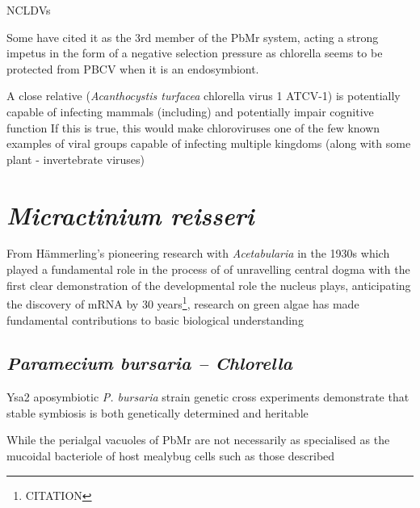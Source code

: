 NCLDVs 

Some have cited it as the 3rd member of the PbMr system, acting a strong impetus in the form of a negative
selection pressure as chlorella seems to be protected from PBCV when it is an endosymbiont.


A close relative (\textit{Acanthocystis turfacea} chlorella virus 1 ATCV-1) is potentially capable of 
infecting mammals (including) and potentially impair cognitive function
If this is true, this would make chloroviruses one of the few known examples of viral groups capable of infecting 
multiple kingdoms (along with some plant - invertebrate viruses) \citep{Yolken2014}





\section{\textit{Micractinium reisseri}}
From H\"ammerling's pioneering research with \textit{Acetabularia} in the 1930s 
which played a fundamental role in the process of 
of unravelling central dogma with the first clear demonstration of the 
developmental role the nucleus plays, anticipating the discovery of mRNA by 30 years\footnote{CITATION}, research on green algae has made fundamental contributions
to basic biological understanding

\subsection{\textit{Paramecium bursaria – Chlorella}}

Ysa2 aposymbiotic \textit{P. bursaria} strain genetic cross experiments demonstrate that stable symbiosis
is both genetically determined and heritable \citep{Tonooka2007}




While the perialgal vacuoles of PbMr are not necessarily as specialised as the 
mucoidal bacteriole of host mealybug cells such as those described \citep{vonDohlen2001}

